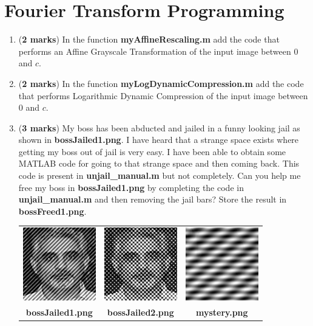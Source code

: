 \documentclass[11pt]{article} %
\begin{document}
\section*{Fourier Transform Programming}
\begin{enumerate}
\item (\textbf{2 marks}) In the function \textbf{myAffineRescaling.m} add the code that performs an Affine Grayscale Transformation of the input image between $0$ and $c$.
\item (\textbf{2 marks}) In the function \textbf{myLogDynamicCompression.m} add the code that performs Logarithmic Dynamic Compression of the input image between $0$ and $c$.
\item (\textbf{3 marks}) My boss has been abducted and jailed in a funny looking jail as shown in \textbf{bossJailed1.png}. I have heard that a strange space exists where getting my boss out of jail is very easy. I have been able to obtain some MATLAB code for going to that strange space and then coming back. This code is present in \textbf{unjail\_manual.m} but not completely. Can you help me free my boss in \textbf{bossJailed1.png} by completing the code in \textbf{unjail\_manual.m} and then removing the jail bars? Store the result in \textbf{bossFreed1.png}.

\begin{tabular}{ccc}
\includegraphics[width=.3\linewidth]{bossJailed1}&
\includegraphics[width=.3\linewidth]{bossJailed2}&
\includegraphics[width=.3\linewidth]{mystery}
\\\textbf{bossJailed1.png} & \textbf{bossJailed2.png} & \textbf{mystery.png}
\end{tabular}


\end{enumerate}
\end{document}
